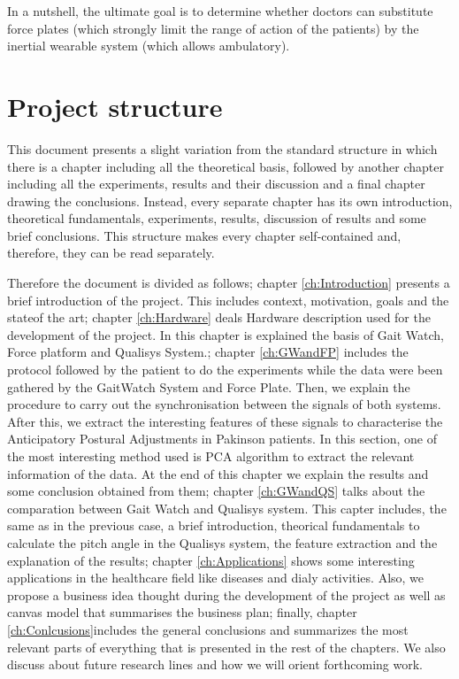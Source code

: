 In a nutshell, the ultimate goal is to determine whether doctors can substitute force plates (which strongly limit the range of action of the patients) by the inertial wearable system (which allows ambulatory).


\section{Project structure}
This document presents a slight variation from the standard structure in which there is a chapter including all the theoretical basis, followed by another chapter including all the experiments, results and their discussion and a final chapter drawing the conclusions. Instead, every separate chapter has its own introduction, theoretical fundamentals, experiments, results, discussion of results and some brief conclusions. This structure makes every chapter self-contained and, therefore, they can be read separately.
 
Therefore the document is divided as follows; chapter \ref{ch:Introduction} presents a brief introduction of the project. This includes  context, motivation, goals and the stateof the art; chapter \ref{ch:Hardware} deals Hardware description used for the development of the project. In this chapter is explained the basis of Gait Watch, Force platform and Qualisys System.; chapter \ref{ch:GWandFP} includes the protocol followed by the patient to do the experiments while the data were been gathered by the GaitWatch System and Force Plate. Then, we explain the procedure to carry out the synchronisation between the signals of both systems. After this, we extract the interesting features of these signals to characterise the Anticipatory Postural Adjustments in Pakinson patients. In this section, one of the most interesting method used is PCA algorithm to extract the relevant information of the data. At the end of this chapter we explain the results and some conclusion obtained from them; chapter \ref{ch:GWandQS} talks about the comparation between Gait Watch and Qualisys system. This capter includes, the same as in the previous case, a brief introduction, theorical fundamentals to calculate the pitch angle in the Qualisys system, the feature extraction and the explanation of the results; chapter \ref{ch:Applications} shows some interesting applications in the healthcare field  like diseases and dialy activities. Also, we propose a business idea thought during the development of the project as well as canvas model that summarises the business plan; finally, chapter \ref{ch:Conlcusions}includes the general conclusions and summarizes the most relevant parts of everything that is presented in the rest of the chapters. We also discuss about future research lines and how we will orient forthcoming work.

